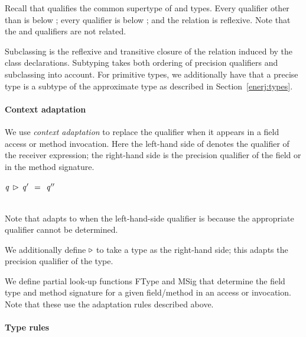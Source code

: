\noindent
Recall that \top{} qualifies the common supertype of \precise{} and
\approx{} types.
Every qualifier other than \top{} is below \lost{};
every qualifier is below \top{}; and the relation is
reflexive.
Note that the \precise{} and \approx{} qualifiers are not
related.

Subclassing is the reflexive and transitive closure of the relation
induced by the class declarations.
Subtyping takes both ordering of precision qualifiers and subclassing
into account.
For primitive types, we additionally have that a precise type is a
subtype of the approximate type as described in Section~\ref{enerj:types}.


\paragraph{Context adaptation}

We use \emph{context adaptation} to replace the \context{} qualifier
when it appears in a field
access or method invocation. Here the left-hand side
of \comb{} denotes the qualifier of the receiver expression;
the right-hand side is the precision qualifier of the field or in the method
signature.

\vspace{0.5ex}
\noindent
\begin{ottdefnblock}[#1]{$ \ottnt{q} \, \rhd\,  \ottnt{q'} \ \  \textsf{=} \ \  \ottnt{q''} $}{}
\ottusedrule{\hfill \ottdruleqcqXXcontext{} \hfill}\\[2mm]
\ottusedrule{\ottdruleqcqXXlost{} \hfill
\ottdruleqcqXXfixed{}\ \ }\\
\end{ottdefnblock}

\noindent
Note that \context{} adapts to \lost{} when the left-hand-side qualifier
is \top{} because the appropriate qualifier cannot be determined.

We additionally define $\triangleright$ to take a type as the
right-hand side; this adapts the precision qualifier of the type.


We define partial look-up functions FType and MSig that determine the field
type and method signature for a given field/method in an access or
invocation.
Note that these use the adaptation rules described above.


\paragraph{Type rules}

